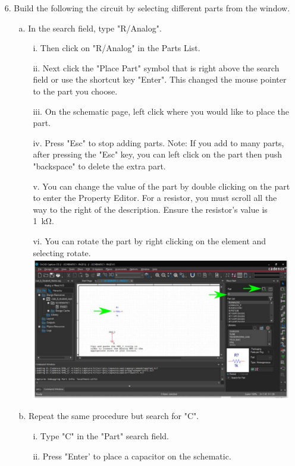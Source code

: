 \documentclass[a4paper]{article}
\begin{document}
\begin{itemize}
  \item[6.] Build the following the circuit by selecting different parts from the window.
  \begin{itemize}
    \item[a.] In the search field, type "R/Analog".
    \begin{itemize}
      \item[i.] Then click on "R/Analog" in the Parts List.
      \item[ii.] Next click the "Place Part" symbol that is right above the search field or use the shortcut key "Enter". This changed the mouse pointer to the part you choose.
      \item[iii.] On the schematic page, left click where you would like to place the part.
      \item[iv.] Press "Esc" to stop adding parts. Note: If you add to many parts, after pressing the "Esc" key, you can left click on the part then push "backspace" to delete the extra part.
      \item[v.] You can change the value of the part by double clicking on the part to enter the Property Editor. For a resistor, you must scroll all the way to the right of the description. Ensure the resistor’s value is \SI{1}{\kilo\ohm}.
      \item[vi.] You can rotate the part by right clicking on the element and selecting rotate. \\
      \includegraphics[scale=0.5]{7.png} \\ 
    \end{itemize} 
  \item[b.] Repeat the same procedure but search for "C".
  \begin{itemize}
    \item[i.] Type "C" in the "Part" search field.
    \item[ii.] Press "Enter’ to place a capacitor on the schematic.

\end{itemize}
\end{itemize}
\end{itemize}
\end{document}
